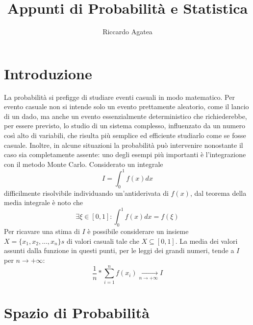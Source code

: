 \documentclass{article}
\title{Appunti di Probabilità e Statistica}
\author{Riccardo Agatea}
\theoremstyle{plain}
\theoremstyle{definition}
\theoremstyle{remark}
\begin{document}
\maketitle
\newpage
{}
\tableofcontents
\newpage
{}
\section{Introduzione} %
\label{sec:introduzione}
La probabilità si prefigge di studiare eventi casuali in modo matematico. Per evento casuale non si intende solo un evento prettamente aleatorio, come il lancio di un dado, ma anche un evento essenzialmente deterministico che richiederebbe, per essere previsto, lo studio di un sistema complesso, influenzato da un numero così alto di variabili, che risulta più semplice ed efficiente studiarlo come se fosse casuale. Inoltre, in alcune situazioni la probabilità può intervenire nonostante il caso sia completamente assente: uno degli esempi più importanti è l'integrazione con il metodo Monte Carlo. Considerato un integrale
\begin{equation*}
	I=\int_0^1 f(x)dx
\end{equation*}
difficilmente risolvibile individuando un'antiderivata di $f(x)$, dal teorema della media integrale è noto che
\begin{equation*}
	\exists\xi\in [0,1]\colon\int_0^1 f(x)dx=f(\xi)
\end{equation*}
Per ricavare una stima di $I$ è possibile considerare un insieme $X=\{x_1,x_2,...,x_n\}s$ di valori casuali tale che $X\subseteq [0,1]$. La media dei valori assunti dalla funzione in questi punti, per le leggi dei grandi numeri, tende a $I$ per $n\to+\infty$:
\begin{equation*}
	\frac{1}{n}*\sum_{i=1}^{n}f(x_i)\xrightarrow[n\to+\infty]{}I
\end{equation*}
\section{Spazio di Probabilità} %
\label{sec:spazio_di_probabilità}
\end{document}
